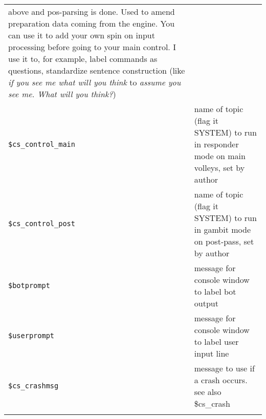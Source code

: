 \documentclass[]{article}
\begin{document}
\begin{longtable}[]{@{}ll@{}}
\begin{minipage}[t]{0.10\columnwidth}
above and pos-parsing is done. Used to amend preparation data coming
from the engine. You can use it to add your own spin on input processing
before going to your main control. I use it to, for example, label
commands as questions, standardize sentence construction (like \emph{if
you see me what will you think} to \emph{assume you see me. What will
you think?})\strut
\end{minipage}\tabularnewline
\begin{minipage}[t]{0.26\columnwidth}\raggedright\strut
\texttt{\$cs\_control\_main}\strut
\end{minipage} & \begin{minipage}[t]{0.10\columnwidth}\raggedright\strut
name of topic (flag it SYSTEM) to run in responder mode on main volleys,
set by author\strut
\end{minipage}\tabularnewline
\begin{minipage}[t]{0.26\columnwidth}\raggedright\strut
\texttt{\$cs\_control\_post}\strut
\end{minipage} & \begin{minipage}[t]{0.10\columnwidth}\raggedright\strut
name of topic (flag it SYSTEM) to run in gambit mode on post-pass, set
by author\strut
\end{minipage}\tabularnewline
\begin{minipage}[t]{0.26\columnwidth}\raggedright\strut
\texttt{\$botprompt}\strut
\end{minipage} & \begin{minipage}[t]{0.10\columnwidth}\raggedright\strut
message for console window to label bot output\strut
\end{minipage}\tabularnewline
\begin{minipage}[t]{0.26\columnwidth}\raggedright\strut
\texttt{\$userprompt}\strut
\end{minipage} & \begin{minipage}[t]{0.10\columnwidth}\raggedright\strut
message for console window to label user input line\strut
\end{minipage}\tabularnewline
\begin{minipage}[t]{0.26\columnwidth}\raggedright\strut
\texttt{\$cs\_crashmsg}\strut
\end{minipage} & \begin{minipage}[t]{0.10\columnwidth}\raggedright\strut
message to use if a crash occurs. see also \$cs\_crash\strut
\end{minipage}\tabularnewline
\begin{minipage}[t]{0.26\columnwidth}\raggedright\strut

\end{minipage}
\end{longtable}
\end{document}
